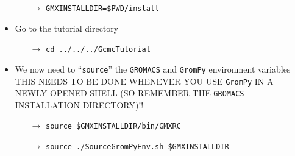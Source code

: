\documentclass[fleqn,a4paper,12pt]{article}
\begin{document}
\begin{itemize}
	\begin{itemize}
		\item[$\to$] {\tt GMXINSTALLDIR=\$PWD/install}
	\end{itemize}
	\item Go to the tutorial directory
	\begin{itemize}
	  	\item[$\to$] {\tt cd ../../../GcmcTutorial} 
	\end{itemize}
	\item We now need to ``{\tt source}'' the {\tt GROMACS} and {\tt GromPy}
	      environment variables\\
		  THIS NEEDS TO BE DONE WHENEVER YOU USE {\tt GromPy} IN A NEWLY OPENED
		  SHELL (SO REMEMBER THE {\tt GROMACS} INSTALLATION DIRECTORY)!!
	\begin{itemize}
	    \item[$\to$] {\tt source \$GMXINSTALLDIR/bin/GMXRC}
	  	\item[$\to$] {\tt source ./SourceGromPyEnv.sh \$GMXINSTALLDIR} 
  	\end{itemize}
\end{itemize}
\end{document}

